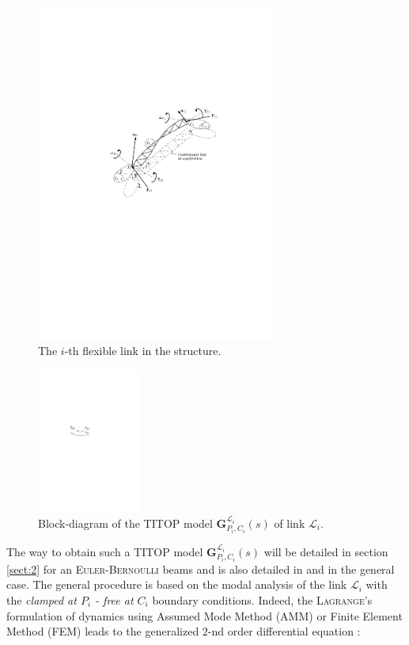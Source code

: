 \documentclass[smallcondensed]{svjour3}     %
\begin{document}
\begin{figure}[htbp!]
  \includegraphics[width=0.7\textwidth]{linki}
\caption{The $i$-th flexible link in the structure.}
\label{fig:linki} 
\end{figure}

\begin{figure}[htbp!]
  \includegraphics[width=0.3\textwidth]{blki}
\caption{Block-diagram of the TITOP model $\mathbf{G}_{P_i,C_i}^{\mathcal{L}_i}(s)$ of link $\mathcal{L}_i$.}
\label{fig:blki} 
\end{figure}

The way to obtain such a TITOP model $\mathbf{G}_{P_i,C_i}^{\mathcal{L}_i}(s)$ will be detailed in section \ref{sect:2} for an \textsc{Euler-Bernoulli} beams and is also detailed in \cite{Alazard2015} and \cite{Perez2015_LM} in the general case. The general procedure is based on the modal analysis of the link $\mathcal{L}_i$ with the \textit{clamped at $P_i$ - free at $C_i$} boundary conditions.  Indeed, the \textsc{Lagrange}'s formulation of dynamics using Assumed Mode Method (AMM) or Finite Element Method (FEM) leads to the generalized $2$-nd order differential equation \cite{TheodoreG95,ShabanaMSD1997}:
\end{document}
